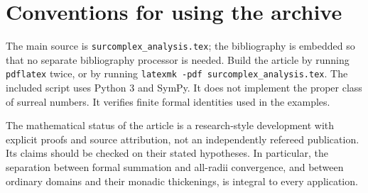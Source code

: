 \documentclass[11pt,oneside]{article}
\theoremstyle{definition}\newtheorem{definition}[theorem]{Definition}
\begin{document}
\section{Conventions for using the archive}
The main source is \texttt{surcomplex\_analysis.tex}; the bibliography is embedded so that no separate bibliography processor is needed. Build the article by running \texttt{pdflatex} twice, or by running \texttt{latexmk -pdf surcomplex\_analysis.tex}. The included script uses Python 3 and SymPy. It does not implement the proper class of surreal numbers. It verifies finite formal identities used in the examples.

The mathematical status of the article is a research-style development with explicit proofs and source attribution, not an independently refereed publication. Its claims should be checked on their stated hypotheses. In particular, the separation between formal summation and all-radii convergence, and between ordinary domains and their monadic thickenings, is integral to every application.
\end{document}
